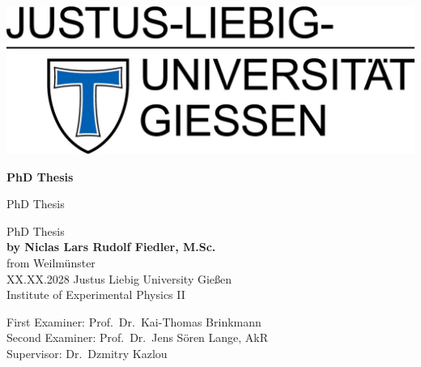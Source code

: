 \documentclass[a4paper,12pt,twoside]{report}
\begin{document}
\begin{titlepage}
   \begin{center} 
      \vspace*{1cm}
      \includegraphics[scale=1.2]{fig/jlu.png}
      \vspace{1.5cm}

      \textbf{\LARGE{PhD Thesis}} %
  
      \vspace{1.5cm}
  
      {\large{PhD Thesis}}
  
      \vspace{1.5cm}
  
      PhD Thesis\\
      \textbf{by Niclas Lars Rudolf Fiedler, M.Sc.}\\
      from Weilmünster\\
      
      XX.XX.2028
      \vfill
      Justus Liebig University Gießen\\
      Institute of Experimental Physics II
      \vspace{0.8cm}
      
      First Examiner: Prof.\ Dr.\ Kai-Thomas Brinkmann\\
      Second Examiner: Prof.\ Dr.\ Jens Sören Lange, AkR\\
      Supervisor: Dr.~Dzmitry Kazlou 
   \end{center}
\end{titlepage}

\newpage\null\thispagestyle{empty}\newpage

\begin{abstract}
  \thispagestyle{plain}
  
\end{abstract}

\begin{abstract}
  \thispagestyle{plain}
  
\end{abstract}
\end{document}
